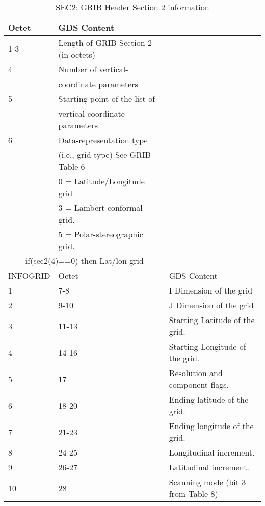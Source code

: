 \setlongtables
\begin{longtable}{l|l|l}
\caption{SEC2: GRIB Header Section 2 information}\\
\hline
\hline
Octet & GDS Content & \\
\hline
     1-3 &  Length of GRIB Section 2 (in octets)    &  \\
       4  &  Number of vertical-& \\
          & coordinate parameters &  \\            
       5  &  Starting-point of the list of & \\
          &  vertical-coordinate parameters & \\
       6  &  Data-representation type & \\
          &   (i.e., grid type)  See GRIB Table 6 &  \\  
           &      0 = Latitude/Longitude grid &  \\                       
           &      3 = Lambert-conformal grid. &  \\                         
           &      5 = Polar-stereographic grid. &  \\    
\hline
\multicolumn{2}{c}{if(sec2(4)==0) then Lat/lon grid} & \\
INFOGRID & Octet & GDS Content \\
\hline
     1 &    7-8  &  I Dimension of the grid  \\                                 
     2 &  9-10  &  J Dimension of the grid   \\                                
     3 &      11-13  &  Starting Latitude of the grid. \\                           
     4 &      14-16  &  Starting Longitude of the grid. \\                          
     5 &     17  &  Resolution and component flags.  \\                         
     6 &      18-20  &  Ending latitude of the grid. \\                             
     7 &      21-23  &  Ending longitude of the grid.\\                             
     8 &      24-25  &  Longitudinal increment.  \\                                 
     9 &      26-27  &  Latitudinal increment.     \\                               
    10 &    28  &  Scanning mode (bit 3 from Table 8) \\                        

\end{longtable}
